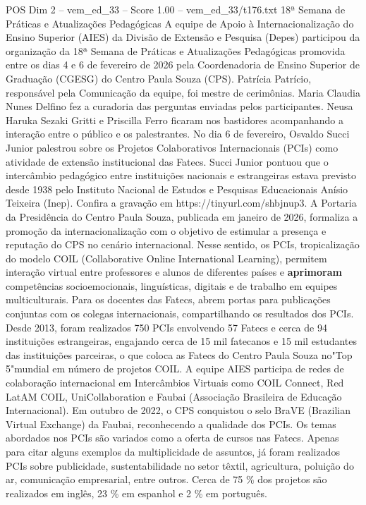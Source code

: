 \begin{textsample}{POS Dim 2 – vem\_ed\_33 – Score 1.00 – vem\_ed\_33/t176.txt}  \label{ex:f2_pos_038}
18ª Semana de Práticas e Atualizações Pedagógicas A equipe de Apoio à Internacionalização do Ensino Superior (AIES) da Divisão de Extensão e Pesquisa (Depes) participou da organização da 18ª Semana de Práticas e Atualizações Pedagógicas promovida entre os dias 4 e 6 de fevereiro de 2026 pela Coordenadoria de Ensino Superior de Graduação (CGESG) do Centro Paula Souza (CPS).
Patrícia Patrício, responsável pela Comunicação da equipe, foi mestre de cerimônias.
Maria Claudia Nunes Delfino fez a curadoria das perguntas enviadas pelos participantes.
Neusa Haruka Sezaki Gritti e Priscilla Ferro ficaram nos bastidores acompanhando a interação entre o público e os palestrantes.
No dia 6 de fevereiro, Osvaldo Succi Junior palestrou sobre os Projetos Colaborativos Internacionais (PCIs) como atividade de extensão institucional das Fatecs.
Succi Junior pontuou que o intercâmbio pedagógico entre instituições nacionais e estrangeiras estava previsto desde 1938 pelo Instituto Nacional de Estudos e Pesquisas Educacionais Anísio Teixeira (Inep).
Confira a gravação em https://tinyurl.com/shbjnup3.
A Portaria da Presidência do Centro Paula Souza, publicada em janeiro de 2026, formaliza a promoção da internacionalização com o objetivo de estimular a presença e reputação do CPS no cenário internacional.
Nesse sentido, os PCIs, tropicalização do modelo COIL (Collaborative Online International Learning), permitem interação virtual entre professores e alunos de diferentes países e \textbf{aprimoram} competências socioemocionais, linguísticas, digitais e de trabalho em equipes multiculturais.
Para os docentes das Fatecs, abrem portas para publicações conjuntas com os colegas internacionais, compartilhando os resultados dos PCIs.
Desde 2013, foram realizados 750 PCIs envolvendo 57 Fatecs e cerca de 94 instituições estrangeiras, engajando cerca de 15 mil fatecanos e 15 mil estudantes das instituições parceiras, o que coloca as Fatecs do Centro Paula Souza no"Top 5"mundial em número de projetos COIL.
A equipe AIES participa de redes de colaboração internacional em Intercâmbios Virtuais como COIL Connect, Red LatAM COIL, UniCollaboration e Faubai (Associação Brasileira de Educação Internacional).
Em outubro de 2022, o CPS conquistou o selo BraVE (Brazilian Virtual Exchange) da Faubai, reconhecendo a qualidade dos PCIs.
Os temas abordados nos PCIs são variados como a oferta de cursos nas Fatecs.
Apenas para citar alguns exemplos da multiplicidade de assuntos, já foram realizados PCIs sobre publicidade, sustentabilidade no setor têxtil, agricultura, poluição do ar, comunicação empresarial, entre outros.
Cerca de 75 \% dos projetos são realizados em inglês, 23 \% em espanhol e 2 \% em português.

\end{textsample}
